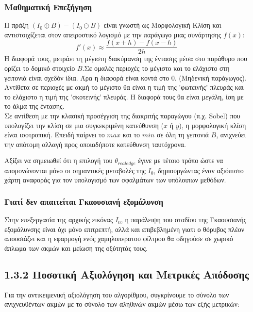 \documentclass[12pt,a4paper]{article}
\begin{document}
\subsubsection*{Μαθηματική Επεξήγηση}
\hspace{0.6cm}Η πράξη $(I_0 \oplus B) - (I_0 \ominus B)$ είναι γνωστή ως Μορφολογική Κλίση και αντιστοιχίζεται στον απειροστικό λογισμό με την παράγωγο μιας συνάρτησης $f(x)$: $$f'(x) \approx \frac{f(x+h) - f(x-h)}{2h}$$
\hspace{0.6cm}Η διαφορά τους, μετράει τη μέγιστη διακύμανση της έντασης μέσα στο παράθυρο που ορίζει το δομικό στοιχείο $B$.Σε ομαλές περιοχές το μέγιστο και το ελάχιστο στη γειτονιά είναι σχεδόν ίδια. Άρα η διαφορά είναι κοντά στο $0$. (Μηδενική παράγωγος). Αντίθετα σε περιοχές με ακμή το μέγιστο θα είναι η τιμή της 'φωτεινής' πλευράς και το ελάχιστο η τιμή της 'σκοτεινής' πλευράς. Η διαφορά τους θα είναι μεγάλη, ίση με το άλμα της έντασης.
\\
\hspace{0.6cm}Σε αντίθεση με την κλασική προσέγγιση της διακριτής παραγώγου (π.χ. \foreignlanguage{english}{Sobel}) που υπολογίζει την κλίση σε μια συγκεκριμένη κατεύθυνση ($x$ ή $y$), η μορφολογική κλίση είναι ισοτροπική. Επειδή παίρνει το $max$ και το $min$ σε όλη τη γειτονιά $B$, ανιχνεύει την απότομη αλλαγή προς οποιαδήποτε κατεύθυνση ταυτόχρονα.

Αξίζει να σημειωθεί ότι η επιλογή του $\theta_{realedge}$ έγινε με τέτοιο τρόπο ώστε να απομονώνονται μόνο οι σημαντικές μεταβολές της $I_0$, δημιουργώντας έναν αξιόπιστο χάρτη αναφοράς για τον υπολογισμό των σφαλμάτων των υπόλοιπων μεθόδων.


\subsubsection*{Γιατί δεν απαιτείται Γκαουσιανή εξομάλυνση}
\hspace{0.6cm}Στην επεξεργασία της αρχικής εικόνας $I_0$, η παράλειψη του σταδίου της Γκαουσιανής εξομάλυνσης είναι όχι μόνο επιτρεπτή, αλλά και επιβεβλημένη γιατι ο θόρυβος πλέον απουσιάζει και η εφαρμογή ενός χαμηλοπερατου φίλτρου θα οδηγούσε σε χωρικό άπλωμα των ακμών και μείωση της οξύτητάς τους.

\subsection*{1.3.2 Ποσοτική Αξιολόγηση και Μετρικές Απόδοσης}

Για την αντικειμενική αξιολόγηση του αλγορίθμου, συγκρίνουμε το σύνολο των ανιχνευθέντων ακμών με το σύνολο των αληθινών ακμών μέσω των εξής μετρικών:
\end{document}
